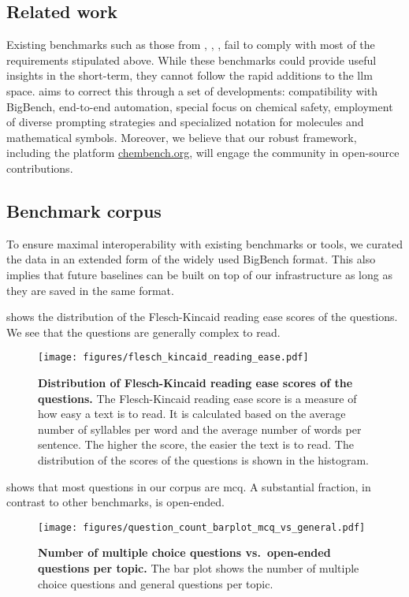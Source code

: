 \subsection{Related work}
Existing benchmarks such as those from \textcite{guo2023large}, \textcite{sun2023scieval}, \textcite{Schulze_Balhorn_2024}, \textcite{Cai_2024} fail to comply with most of the requirements stipulated above. 
While these benchmarks could provide useful insights in the short-term, they cannot follow the rapid additions to the \gls{llm} space. 
\chembench aims to correct this through a set of developments: compatibility with BigBench, end-to-end automation, special focus on chemical safety, employment of diverse prompting strategies and specialized notation for molecules and mathematical symbols. 
Moreover, we believe that our robust framework, including the platform \url{chembench.org}, will engage the community in open-source contributions.


\subsection{Benchmark corpus}
To ensure maximal interoperability with existing benchmarks or tools, we curated the data in an extended form of the widely used BigBench format.\autocite{srivastava2022beyond}
This also implies that future baselines can be built on top of our infrastructure as long as they are saved in the same format.


 shows the distribution of the Flesch-Kincaid reading ease scores of the questions.  
We see that the questions are generally complex to read. 

\begin{figure}[htb]
    \centering
    \texttt{[image: figures/flesch\_kincaid\_reading\_ease.pdf]}
    \caption{\textbf{Distribution of Flesch-Kincaid reading ease scores of the questions.} The Flesch-Kincaid reading ease score\autocite{flesch1948new} is a measure of how easy a text is to read. It is calculated based on the average number of syllables per word and the average number of words per sentence. The higher the score, the easier the text is to read. The distribution of the scores of the questions is shown in the histogram. }
    \label{fig:flesch_kincaid_reading_ease}
\end{figure}

 shows that most questions in our corpus are \gls{mcq}.
A substantial fraction, in contrast to other benchmarks, is open-ended. 
\begin{figure}[htb]
    \centering
    \texttt{[image: figures/question\_count\_barplot\_mcq\_vs\_general.pdf]}
    \caption{\textbf{Number of multiple choice questions vs.\ open-ended questions per topic.} The bar plot shows the number of multiple choice questions and general questions per topic.}
    \label{fig:question_count_barplot_mcq_vs_general}
\end{figure}

